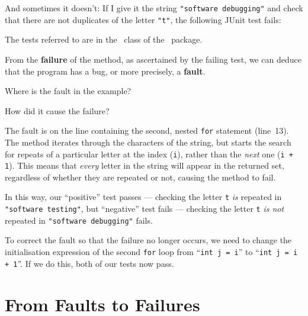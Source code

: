 \newpage
And sometimes it doesn't: If I give it the string {\tt "software debugging"} and
check that there are not duplicates of the letter {\tt "t"}, the following JUnit
test fails:

\begin{center} 
\end{center} 

The tests referred to are in the \teststringutilsbuggyoneclass~class of the
\lecturespackage~package.

From the {\bf failure} of the method, as ascertained by the failing test, we can
deduce that the program has a bug, or more precisely, a {\bf fault}.


Where is the fault in the example?

How did it cause the failure?


The fault is on the line containing the second, nested {\tt for} statement
(line~13). The method iterates through the characters of the string, but starts
the search for repeats of a particular letter at the {\it } index ({\tt i}),
rather than the {\it next} one ({\tt i + 1}). This means that {\it every} letter
in the string will appear in the returned set, regardless of whether they are
repeated or not, causing the method to fail. 

In this way, our ``positive'' test passes --- checking the letter {\tt t} {\it
is} repeated in {\tt "software testing"}, but ``negative'' test fails ---
checking the letter {\tt t} {\it is not} repeated in {\tt "software debugging"}
fails.

To correct the fault so that the failure no longer occurs, we need to change the
initialisation expression of the second {\tt for} loop from ``{\tt int j = i}''
to ``{\tt int j = i + 1}''. If we do this, both of our tests now pass.



\section{From Faults to Failures}

